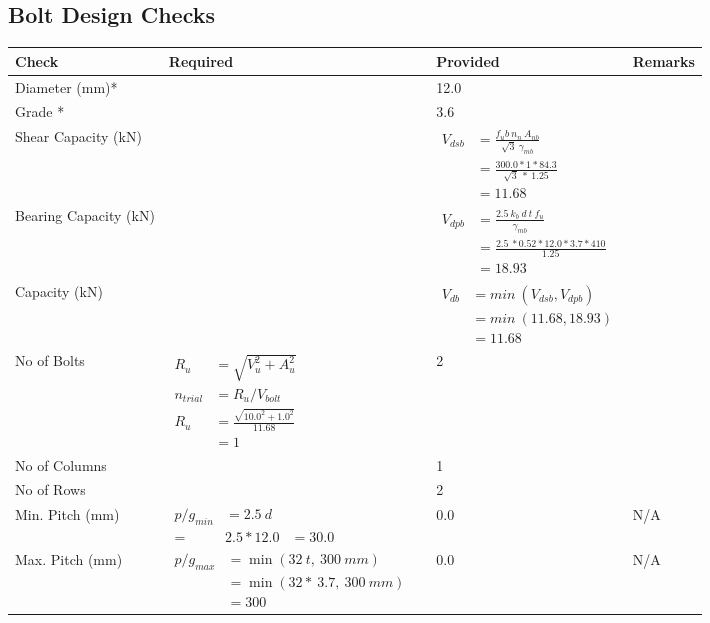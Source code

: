 \documentclass{article}%
\begin{document}
\subsection{Bolt Design Checks}%
\label{subsec:BoltDesignChecks}%
\renewcommand{\arraystretch}{1.2}%
\begin{longtable}{|p{4cm}|p{5cm}|p{5.5cm}|p{1.5cm}|}%
\hline%
\rowcolor{OsdagGreen}%
Check&Required&Provided&Remarks\\%
\hline%
\endhead%
\hline%
Diameter (mm)*&&12.0&\\%
\hline%
Grade *&&3.6&\\%
\hline%
Shear Capacity (kN)&&$\begin{aligned}V_{dsb} &= \frac{f_ub ~n_n~ A_{nb}}{\sqrt{3} ~\gamma_{mb}}\\ &= \frac{300.0*1*84.3}{\sqrt{3}~*~1.25}\\ &= 11.68\end{aligned}$&\\%
\hline%
Bearing Capacity (kN)&&$\begin{aligned}V_{dpb} &= \frac{2.5~ k_b~ d~ t~ f_u}{\gamma_{mb}}\\ &= \frac{2.5~*0.52*12.0*3.7*410}{1.25}\\ &=18.93\end{aligned}$&\\%
\hline%
Capacity (kN)&&$\begin{aligned}V_{db} &= min~ (V_{dsb}, V_{dpb})\\ &= min~ (11.68,18.93)\\ &=11.68\end{aligned}$&\\%
\hline%
No of Bolts&$\begin{aligned}R_{u} &= \sqrt{V_u^2+A_u^2}\\ n_{trial} &= R_u/ V_{bolt}\\ R_{u} &= \frac{\sqrt{10.0^2+1.0^2}}{11.68}\\ &=1\end{aligned}$&2&\\%
\hline%
No of Columns&&1&\\%
\hline%
No of Rows&&2&\\%
\hline%
Min. Pitch (mm)&$\begin{aligned}p/g_{min}&= 2.5 ~ d&\\ =&2.5*12.0&=30.0\end{aligned}$&0.0&N/A\\%
\hline%
Max. Pitch (mm)&$\begin{aligned}p/g_{max} &=\min(32~t,~300~mm)&\\ &=\min(32 *~3.7,~ 300 ~mm)\\&=300\end{aligned}$&0.0&N/A\\%

\end{longtable}
\end{document}
